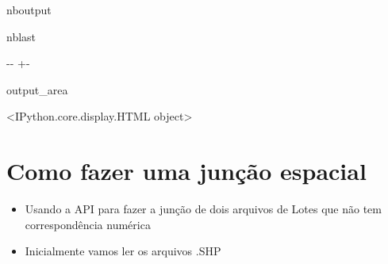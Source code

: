 \documentclass[letterpaper,10pt,brazil]{sphinxmanual}
\newlength\nbsphinxcodecellspacing
\begin{document}
\begin{sphinxuseclass}{nboutput}
\begin{sphinxuseclass}{nblast}
{

\kern-\sphinxverbatimsmallskipamount\kern-\baselineskip
\kern+\FrameHeightAdjust\kern-\fboxrule
\vspace{\nbsphinxcodecellspacing}

\begin{sphinxuseclass}{output_area}
\begin{sphinxuseclass}{}


\begin{sphinxVerbatim}[commandchars=\\\{\}]
\llap{\color{nbsphinxout}[2]:\,\hspace{\fboxrule}\hspace{\fboxsep}}<IPython.core.display.HTML object>
\end{sphinxVerbatim}



\end{sphinxuseclass}
\end{sphinxuseclass}
}

\end{sphinxuseclass}
\end{sphinxuseclass}
\sphinxstepscope


\section{Como fazer uma junção espacial}
\label{\detokenize{exemplos/cruzamento_lotes:Como-fazer-uma-jun_xe7_xe3o-espacial}}\label{\detokenize{exemplos/cruzamento_lotes::doc}}\begin{itemize}
\item {} 
\sphinxAtStartPar
Usando a API para fazer a junção de dois arquivos de Lotes que não tem correspondência numérica

\item {} 
\sphinxAtStartPar
Inicialmente vamos ler os arquivos .SHP

\end{itemize}
\end{document}
